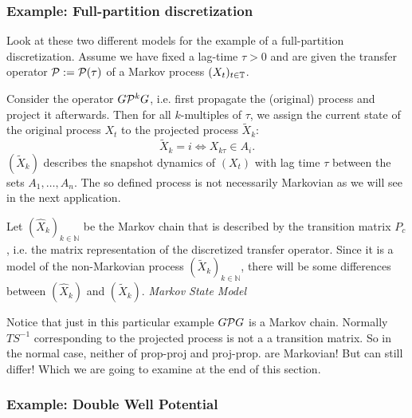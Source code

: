 \subsubsection*{Example: Full-partition discretization}

Look at these two different models for the example of a full-partition discretization.
Assume we have fixed a lag-time $\tau > 0$ and are given the transfer operator $\mathcal{P} := \mathcal{P}(\tau)$ of a Markov process $(X_t)_{t \in \mathbb{T}}$.

Consider the operator $G\mathcal{P}^k G$, i.e. first propagate the (original) process and project it afterwards. Then for all $k$-multiples of $\tau$, we assign the current state of the original process $X_t$ to the projected process $\widetilde{X}_k$:
\begin{equation*}
\widetilde{X}_k = i \Leftrightarrow X_{k\tau} \in A_i.
\end{equation*}
$(\widetilde{X}_k)$ describes the snapshot dynamics of $(X_t)$ with lag time $\tau$ between the sets $A_1,\dots,A_n$.
The so defined process is not necessarily Markovian as we will see in the next application.

Let $(\widehat{X}_k)_{k\in\mathbb{N}}$ be the Markov chain that is described by the transition matrix $P_c$, i.e. the matrix representation of the discretized transfer operator. Since it is a model of the non-Markovian process $(\widetilde{X}_k)_{k\in\mathbb{N}}$, there will be some differences between $(\widehat{X}_k)$ and $(\widetilde{X}_k)$. \textit{Markov State Model}

Notice that just in this particular example $G\mathcal{P} G$ is a Markov chain. Normally $TS^{-1}$ corresponding to the projected process is not a a transition matrix. So in the normal case, neither of prop-proj and proj-prop. are Markovian! But can still differ! Which we are going to examine at the end of this section.

\subsubsection*{Example: Double Well Potential}


